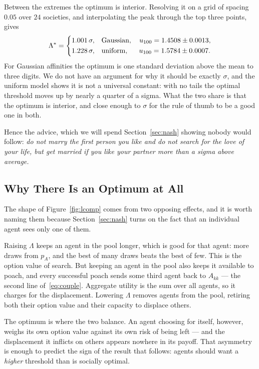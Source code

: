 \documentclass[sigconf,anonymous]{aamas}
\newcommand{\Lopt}{\Lambda^\ast}
\begin{document}
Between the extremes the optimum is interior. Resolving it on a grid of spacing
$0.05$ over $24$ societies, and interpolating the peak through the top three
points, gives
%
\begin{align}
  \Lopt =
  \begin{dcases}
    1.001\,\sigma, & \text{Gaussian}, \quad u_{100} = 1.4508 \pm 0.0013,\\
    1.228\,\sigma, & \text{uniform}, \quad\ \, u_{100} = 1.5784 \pm 0.0007.
  \end{dcases}
  \label{eq:optimum}
\end{align}
%
For Gaussian affinities the optimum is one standard deviation above the mean to
three digits. We do not have an argument for why it should be exactly $\sigma$,
and the uniform model shows it is not a universal constant: with no tails the
optimal threshold moves up by nearly a quarter of a sigma. What the two share is
that the optimum is interior, and close enough to $\sigma$ for the rule of thumb
to be a good one in both.

Hence the advice, which we will spend Section~\ref{sec:nash} showing nobody
would follow: \emph{do not marry the first person you like and do not search for
the love of your life, but get married if you like your partner more than a
sigma above average.}

\subsection{Why There Is an Optimum at All}

The shape of Figure~\ref{fig:lcomp} comes from two opposing effects, and it is
worth naming them because Section~\ref{sec:nash} turns on the fact that an
individual agent sees only one of them.

Raising $\Lambda$ keeps an agent in the pool longer, which is good for that
agent: more draws from $p_A$, and the best of many draws beats the best of few.
This is the option value of search. But keeping an agent in the pool also keeps
it available to poach, and every successful poach sends some third agent back to
$A_{kk}$ --- the second line of~\eqref{eq:couple}. Aggregate utility is the sum
over all agents, so it charges for the displacement. Lowering $\Lambda$ removes
agents from the pool, retiring both their option value and their capacity to
displace others.

The optimum is where the two balance. An agent choosing for itself, however,
weighs its own option value against its own risk of being left --- and the
displacement it inflicts on others appears nowhere in its payoff. That
asymmetry is enough to predict the sign of the result that follows: agents
should want a \emph{higher} threshold than is socially optimal.
\end{document}
